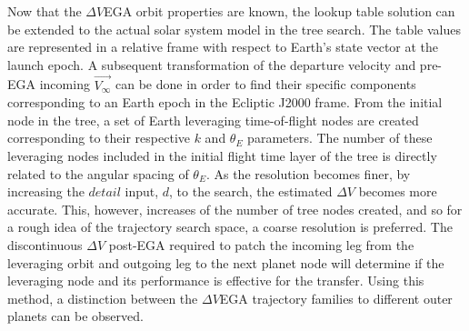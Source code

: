 \documentclass[letterpaper, paper,11pt]{./AAS}		%
\begin{document}
Now that the $\Delta V$EGA orbit properties are known, the lookup table solution can be extended to the actual solar system model in the tree search. The table values are represented in a relative frame with respect to Earth's state vector at the launch epoch. A subsequent transformation of the departure velocity and pre-EGA incoming $\vec{V_\infty}$ can be done in order to find their specific components corresponding to an Earth epoch in the Ecliptic J2000 frame. From the initial node in the tree, a set of Earth leveraging time-of-flight nodes are created corresponding to their respective $k$ and $\theta_E$ parameters. The number of these leveraging nodes included in the initial flight time layer of the tree is directly related to the angular spacing of $\theta_E$. As the resolution becomes finer, by increasing the $\textit{detail}$ input, $d$, to the search, the estimated $\Delta V$ becomes more accurate. This, however, increases of the number of tree nodes created, and so for a rough idea of the trajectory search space, a coarse resolution is preferred. The discontinuous $\Delta V$ post-EGA required to patch the incoming leg from the leveraging orbit and outgoing leg to the next planet node will determine if the leveraging node and its performance is effective for the transfer. Using this method, a distinction between the $\Delta V$EGA trajectory families to different outer planets can be observed.


\phantom{p. 1}
\clearpage
\end{document}
